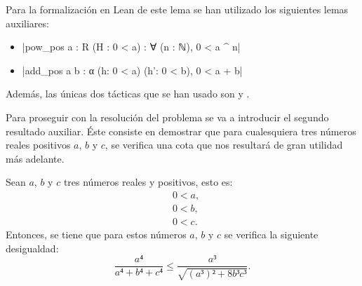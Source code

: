 Para la formalización en Lean de este lema se han utilizado los
siguientes lemas auxiliares:
\begin{itemize}
\item {}|pow_pos {a : R} (H : 0 < a) : ∀ (n : ℕ), 0 < a ^ n|
\item {}|add_pos {a b : α} (h: 0 < a) (h': 0 < b), 0 < a + b|
\end{itemize}

Además, las únicas dos tácticas que se han usado son
 y
.

Para proseguir con la resolución del problema se va a introducir el
segundo resultado auxiliar. Éste consiste en demostrar que para
cualesquiera tres números reales positivos \(a\), \(b\) y \(c\), se
verifica una cota que nos resultará de gran utilidad más adelante.

\begin{lema}[cota]\label{lemacota}
  Sean \(a\), \(b\) y \(c\) tres números reales y positivos, esto es:
  \begin{align}
    &0 < a, \label{haq22}\tag{ha}\\
    &0 < b, \label{hbq22}\tag{hb}\\
    &0 < c. \label{hcq22}\tag{hc}
  \end{align}
  Entonces, se tiene que para estos números \(a\), \(b\) y \(c\) se
  verifica la siguiente desigualdad:
  \begin{equation}\label{eqcota}
    \frac{a⁴}{a⁴+b⁴+c⁴} ≤ \frac{a³}{\sqrt{(a³)²+8b³c³}}.
  \end{equation}
\end{lema}

